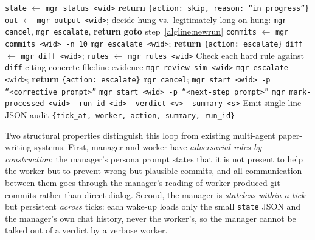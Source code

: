 \begin{algorithm}[t]
\small
\caption{Manager tick loop (one invocation per scheduler kick).}
\label{alg:tick}
\begin{algorithmic}[1]
\State \texttt{state} $\gets$ \texttt{mgr status <wid>} 
    \State \textbf{return} \texttt{\{action: skip, reason: ``in progress''\}}
    \State \texttt{out} $\gets$ \texttt{mgr output <wid>}; decide hung vs.\ legitimately long
    \State on hung: \texttt{mgr cancel}, \texttt{mgr escalate}, \textbf{return}
\EndIf
{}
    \State \textbf{goto} step~\ref{algline:newrun} 
\EndIf
\State \texttt{commits} $\gets$ \texttt{mgr commits <wid> -n 10}
    \State \texttt{mgr escalate <wid>}; \textbf{return} \texttt{\{action: escalate\}}
\EndIf
\State \texttt{diff} $\gets$ \texttt{mgr diff <wid>}; \texttt{rules} $\gets$ \texttt{mgr rules <wid>}
\State Check each hard rule against \texttt{diff} citing concrete file:line evidence
    \State \label{alg:review-sim-guard} \texttt{mgr review-sim <wid>} 
\EndIf
{}
    \State \texttt{mgr escalate <wid>}; \textbf{return} \texttt{\{action: escalate\}}
    \State \texttt{mgr cancel}; \texttt{mgr start <wid> -p ``<corrective prompt>''}
\Else
    \State \label{algline:newrun} \texttt{mgr start <wid> -p ``<next-step prompt>''}
\EndIf
\State \texttt{mgr mark-processed <wid> --run-id <id> --verdict <v> --summary <s>}
\State Emit single-line JSON audit \texttt{\{tick\_at, worker, action, summary, run\_id\}}
\end{algorithmic}
\end{algorithm}

Two structural properties distinguish this loop from existing multi-agent
paper-writing systems. First, manager and worker have \emph{adversarial
roles by construction}: the manager's persona prompt states that it is
not present to help the worker but to prevent wrong-but-plausible
commits, and all communication between them goes through the manager's
reading of worker-produced git commits rather than direct dialog.
Second, the manager is \emph{stateless within a tick} but persistent
\emph{across} ticks: each wake-up loads only the small \texttt{state}
JSON and the manager's own chat history, never the worker's, so the
manager cannot be talked out of a verdict by a verbose worker.

